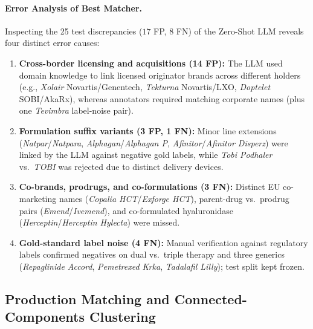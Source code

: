 \documentclass{llncs}
\begin{document}
\paragraph{Error Analysis of Best Matcher.}
Inspecting the 25 test discrepancies ($17$ FP, $8$ FN) of the Zero-Shot LLM reveals four distinct error causes:
\begin{enumerate}
  \item \textbf{Cross-border licensing and acquisitions (14 FP):} The LLM used domain knowledge to link licensed originator brands across different holders (e.g., \textit{Xolair} Novartis/Genentech, \textit{Tekturna} Novartis/LXO, \textit{Doptelet} SOBI/AkaRx), whereas annotators required matching corporate names (plus one \textit{Tevimbra} label-noise pair).
  \item \textbf{Formulation suffix variants (3 FP, 1 FN):} Minor line extensions (\textit{Natpar}/\textit{Natpara}, \textit{Alphagan}/\textit{Alphagan P}, \textit{Afinitor}/\textit{Afinitor Disperz}) were linked by the LLM against negative gold labels, while \textit{Tobi Podhaler} vs.\ \textit{TOBI} was rejected due to distinct delivery devices.
  \item \textbf{Co-brands, prodrugs, and co-formulations (3 FN):} Distinct EU co-marketing names (\textit{Copalia HCT}/\textit{Exforge HCT}), parent-drug vs.\ prodrug pairs (\textit{Emend}/\textit{Ivemend}), and co-formulated hyaluronidase (\textit{Herceptin}/\textit{Herceptin Hylecta}) were missed.
  \item \textbf{Gold-standard label noise (4 FN):} Manual verification against regulatory labels confirmed negatives on dual vs.\ triple therapy and three generics (\textit{Repaglinide Accord}, \textit{Pemetrexed Krka}, \textit{Tadalafil Lilly}); test split kept frozen.
\end{enumerate}

\subsection{Production Matching and Connected-Components Clustering}
\label{subsec:clustering}
\end{document}
